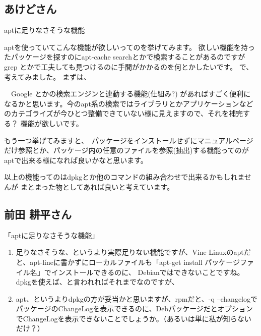 \documentclass[cjk,dvipdfmx]{beamer}
\begin{document}
\subsection{あけどさん}

\begin{frame}
 {aptに足りなさそうな機能}

 aptを使っていてこんな機能が欲しいってのを挙げてみます。
 欲しい機能を持ったパッケージを探すのにapt-cache searchとかで検索することがあるのですが
 grep とかで工夫しても見つけるのに手間がかかるのを何とかしたいです。
 で、考えてみました。
 まずは、

 　Google とかの検索エンジンと連動する機能(仕組み?)  があればすごく便利に
 なるかと思います。今のapt系の検索ではライブラリとかアプリケーションなど
 のカテゴライズが今ひとつ整備できていない様に見えますので、それを補完する？
 機能が欲しいです。
\end{frame}

\begin{frame}
 もう一つ挙げてみますと、　パッケージをインストールせずにマニュアルページ
 だけ参照とか、パッケージ内の任意のファイルを参照(抽出)する機能ってのが
 aptで出来る様になれば良いかなと思います。

 以上の機能ってのはdpkgとか他のコマンドの組み合わせで出来るかもしれませんが
 まとまった物としてあれば良いと考えています。
\end{frame}

\subsection{前田 耕平さん}

\begin{frame}
 {「aptに足りなさそうな機能」}
\begin{enumerate}
 
 \item 足りなさそうな、というより実際足りない機能ですが、Vine
 Linuxのaptだと、apt-lineに書かずにローカルファイルも「apt-get install
 パッケージファイル名」でインストールできるのに、
 Debianではできないことですね。dpkgを使えば、と言われればそれまでなのですが、

 \item apt、というよりdpkgの方が妥当かと思いますが、rpmだと、-q
 --changelogでパッケージのChangeLogを表示できるのに、DebパッケージだとオプションでChangeLogを表示できないことでしょうか。（あるいは単に私が知らないだけ？）
\end{enumerate}
\end{frame}
\end{document}
